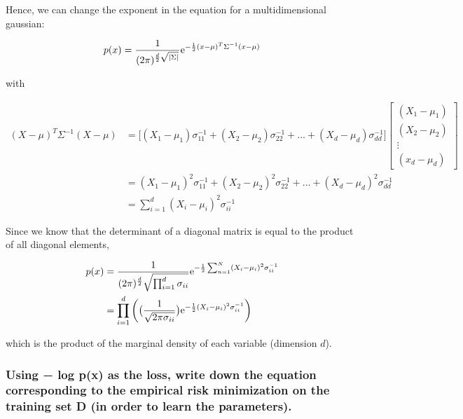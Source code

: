 \documentclass{amsart}
\theoremstyle{definition}
\theoremstyle{remark}
\numberwithin{equation}{section}
\begin{document}
Hence, we can change the exponent in the equation for a multidimensional gaussian:

\begin{equation}
    p(x) = \frac{1}{(2\pi)^{\frac{d}{2} \sqrt{|\Sigma|}}} {\rm e}^{-\frac{1}{2}(x-\mu)^T \Sigma^{-1} (x-\mu)}   
\end{equation}

with 

\begin{equation}
    \begin{align}
    (X-\mu)^T \Sigma^{-1} (X-\mu) & = \big[(X_1-\mu_1)\sigma_{11}^{-1} + (X_2-\mu_2)\sigma_{22}^{-1} + ... + (X_d-\mu_d)\sigma_{dd}^{-1}\big] \begin{bmatrix}
           (X_1-\mu_1) \\
           (X_2-\mu_2) \\
           \vdots \\
           (x_d-\mu_d)
        \end{bmatrix} \\
    & = (X_1-\mu_1)^2 \sigma_{11}^{-1} + (X_2-\mu_2)^2 \sigma_{22}^{-1} + ... + (X_d-\mu_d)^2 \sigma_{dd}^{-1} \\
    & = \sum_{i=1}^{d}(X_i-\mu_i)^2 \sigma_{ii}^{-1}
    \end{align}
\end{equation}

Since we know that the determinant of a diagonal matrix is equal to the product 
of all diagonal elements, 

\begin{equation}
    \begin{align}
    p(x) & = \frac{1}{(2\pi)^{\frac{d}{2}} \sqrt{\prod_{i=1}^{d}\sigma_{ii}}} {\rm e}^{-\frac{1}{2}\sum_{n=1}^{N}(X_i-\mu_i)^2 \sigma_{ii}^{-1}} \\
         & = \prod_{i=1}^{d} \bigg(\big(\frac{1}{\sqrt{2\pi \sigma_{ii}}} \big) {\rm e}^{-\frac{1}{2}(X_i-\mu_i)^2 \sigma_{ii}^{-1}}\bigg)
    \end{align}
\end{equation}

which is the product of the marginal density of each variable (dimension $d$).

\subsubsection{Using − log p(x) as the loss, write down the equation 
corresponding to the empirical risk minimization on the training set D (in order
to learn the parameters).} \\
\end{document}

